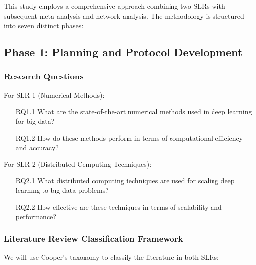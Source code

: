 \documentclass[acmsmall]{acmart}
\begin{document}
This study employs a comprehensive approach combining two SLRs with subsequent meta-analysis and network analysis. The methodology is structured into seven distinct phases:

\subsection{Phase 1: Planning and Protocol Development}\label{subsec:phase-1-planning-and-protocol-development}
\subsubsection{Research Questions}\label{subsubsec:phase-1-planning-and-protocol-development:research-questions}
For SLR 1 (Numerical Methods):
\begin{enumerate}
    \item[RQ1.1] What are the state-of-the-art numerical methods used in deep learning for big data?
    \item[RQ1.2] How do these methods perform in terms of computational efficiency and accuracy?
\end{enumerate}

For SLR 2 (Distributed Computing Techniques):
\begin{enumerate}
    \item[RQ2.1] What distributed computing techniques are used for scaling deep learning to big data problems?
    \item[RQ2.2] How effective are these techniques in terms of scalability and performance?
\end{enumerate}

\subsubsection{Literature Review Classification Framework}\label{subsubsec:phase-1-planning-and-protocol-development:literature-review-classification-framework}
We will use Cooper's taxonomy \citep{cooper1988} to classify the literature in both SLRs:
\end{document}
